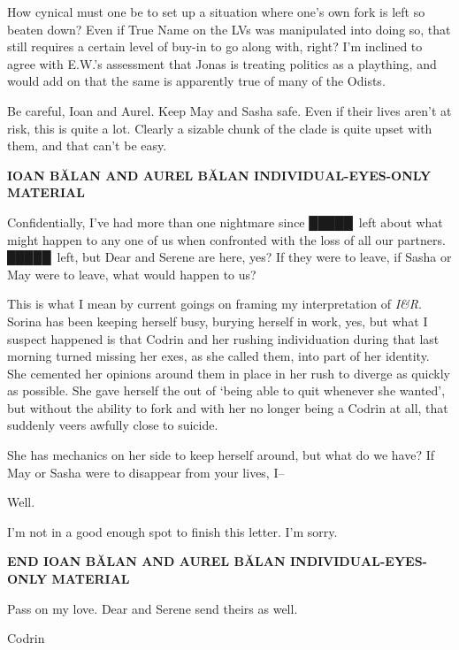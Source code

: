 How cynical must one be to set up a situation where one's own fork is left so beaten down? Even if True Name on the LVs was manipulated into doing so, that still requires a certain level of buy-in to go along with, right? I'm inclined to agree with E.W.'s assessment that Jonas is treating politics as a plaything, and would add on that the same is apparently true of many of the Odists.

Be careful, Ioan and Aurel. Keep May and Sasha safe. Even if their lives aren't at risk, this is quite a lot. Clearly a sizable chunk of the clade is quite upset with them, and that can't be easy.

\begin{center}
\textbf{IOAN BĂLAN AND AUREL BĂLAN INDIVIDUAL-EYES-ONLY MATERIAL}
\end{center}

Confidentially, I've had more than one nightmare since █████\ left about what might happen to any one of us when confronted with the loss of all our partners. █████\ left, but Dear and Serene are here, yes? If they were to leave, if Sasha or May were to leave, what would happen to us?

This is what I mean by current goings on framing my interpretation of \emph{I\&R}. Sorina has been keeping herself busy, burying herself in work, yes, but what I suspect happened is that Codrin and her rushing individuation during that last morning turned missing her exes, as she called them, into part of her identity. She cemented her opinions around them in place in her rush to diverge as quickly as possible. She gave herself the out of `being able to quit whenever she wanted', but without the ability to fork and with her no longer being a Codrin at all, that suddenly veers awfully close to suicide.

She has mechanics on her side to keep herself around, but what do we have? If May or Sasha were to disappear from your lives, I--

Well.

I'm not in a good enough spot to finish this letter. I'm sorry.

\begin{center}
\textbf{END IOAN BĂLAN AND AUREL BĂLAN INDIVIDUAL-EYES-ONLY MATERIAL}
\end{center}

Pass on my love. Dear and Serene send theirs as well.

Codrin

